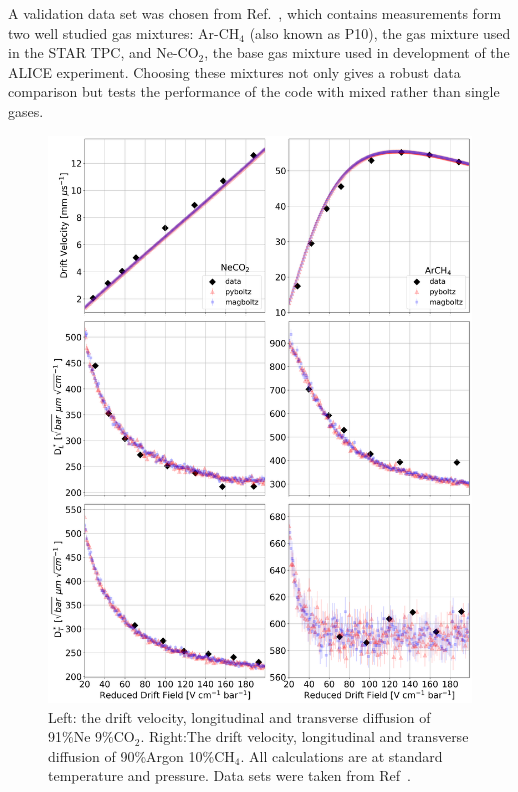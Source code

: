 \documentclass[3p,11pt]{elsarticle}
\begin{document}
A validation data set was chosen from Ref.~\cite{Brockmann:1994gz}, which contains measurements form two well studied gas mixtures: Ar-CH$_4$ (also known as P10), the gas mixture used in the STAR TPC, and Ne-CO$_2$, the base gas mixture used in development of the ALICE experiment. Choosing these mixtures not only gives a robust data comparison but tests the performance of the code with mixed rather than single gases. 
\begin{figure}
\begin{centering}
\includegraphics[width=0.9\columnwidth]{Figures/PyBoltz_DataComp.png}
\par\end{centering}
\caption{Left: the drift velocity, longitudinal and transverse diffusion of 91\%Ne 9\%CO$_2$. Right:The drift velocity, longitudinal and transverse diffusion of 90\%Argon 10\%CH$_4$. All calculations are at standard temperature and pressure. Data sets were taken from Ref~\cite{Brockmann:1994gz}.
\label{fig:PyBoltzDataComp}}
\end{figure}
\end{document}

